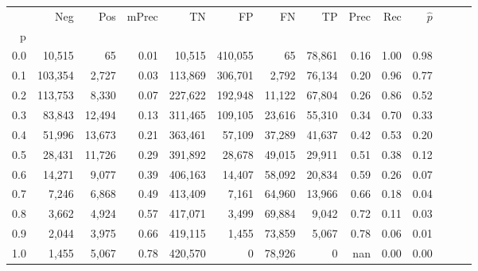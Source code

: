 \begin{tabular}{rrrrrrrrrrrrrr}
\toprule
{} &      Neg &     Pos & mPrec &       TN &       FP &      FN &      TP &  Prec &   Rec & $\hat{p}$ \\
p   &          &         &       &          &          &         &         &       &       &           \\
\midrule
0.0 &   10,515 &      65 &  0.01 &   10,515 &  410,055 &      65 &  78,861 &  0.16 &  1.00 &      0.98 \\
0.1 &  103,354 &   2,727 &  0.03 &  113,869 &  306,701 &   2,792 &  76,134 &  0.20 &  0.96 &      0.77 \\
0.2 &  113,753 &   8,330 &  0.07 &  227,622 &  192,948 &  11,122 &  67,804 &  0.26 &  0.86 &      0.52 \\
0.3 &   83,843 &  12,494 &  0.13 &  311,465 &  109,105 &  23,616 &  55,310 &  0.34 &  0.70 &      0.33 \\
0.4 &   51,996 &  13,673 &  0.21 &  363,461 &   57,109 &  37,289 &  41,637 &  0.42 &  0.53 &      0.20 \\
0.5 &   28,431 &  11,726 &  0.29 &  391,892 &   28,678 &  49,015 &  29,911 &  0.51 &  0.38 &      0.12 \\
0.6 &   14,271 &   9,077 &  0.39 &  406,163 &   14,407 &  58,092 &  20,834 &  0.59 &  0.26 &      0.07 \\
0.7 &    7,246 &   6,868 &  0.49 &  413,409 &    7,161 &  64,960 &  13,966 &  0.66 &  0.18 &      0.04 \\
0.8 &    3,662 &   4,924 &  0.57 &  417,071 &    3,499 &  69,884 &   9,042 &  0.72 &  0.11 &      0.03 \\
0.9 &    2,044 &   3,975 &  0.66 &  419,115 &    1,455 &  73,859 &   5,067 &  0.78 &  0.06 &      0.01 \\
1.0 &    1,455 &   5,067 &  0.78 &  420,570 &        0 &  78,926 &       0 &   nan &  0.00 &      0.00 \\
\bottomrule
\end{tabular}
